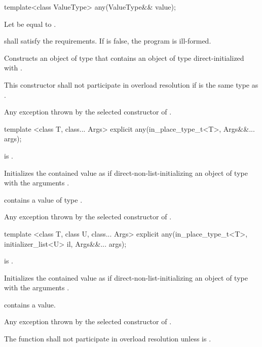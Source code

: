 %
\begin{itemdecl}
template<class ValueType>
any(ValueType&& value);
\end{itemdecl}

\begin{itemdescr}
\pnum
Let  be equal to .

\pnum
\requires
{} shall satisfy the  requirements.
If  is false, the program is ill-formed.

\pnum
\effects
Constructs an object of type  that contains an object of type  direct-initialized with .

\pnum
\remarks
This constructor shall not participate in overload resolution if  is the same type as .

\pnum
\throws
Any exception thrown by the selected constructor of .
\end{itemdescr}

%
\begin{itemdecl}
template <class T, class... Args>
  explicit any(in_place_type_t<T>, Args&&... args);
\end{itemdecl}

\begin{itemdescr}
\pnum
\requires {} is .

\pnum
\effects Initializes the contained value as if direct-non-list-initializing an object of
type  with the arguments .

\pnum
\postconditions {} contains a value of type .

\pnum
\throws Any exception thrown by the selected constructor of .
\end{itemdescr}

%
\begin{itemdecl}
template <class T, class U, class... Args>
  explicit any(in_place_type_t<T>, initializer_list<U> il, Args&&... args);
\end{itemdecl}

\begin{itemdescr}
\pnum
\requires {} is .

\pnum
\effects Initializes the contained value as if direct-non-list-initializing an object of
type  with the arguments .

\pnum
\postconditions {} contains a value.

\pnum
\throws Any exception thrown by the selected constructor of .

\pnum
\remarks The function shall not participate in overload resolution
unless  is .
\end{itemdescr}


